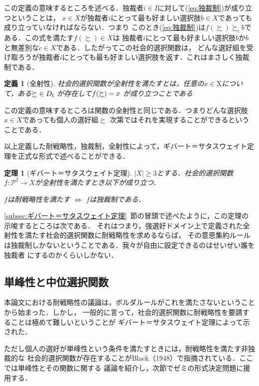 \documentclass[dvipdfmx]{jsarticle}
\newtheorem*{THeorem}{定理}
\newtheorem*{DEfinition}{定義}
\begin{document}
この定義の意味するところを述べる．独裁者$i \in I$に対して(\ref{eq:独裁制})が成り立つということは，
$x \in X$が独裁者$i$にとって最も好ましい選択肢$b \in X$であっても成り立っていなければならない．つまり
このとき(\ref{eq:独裁制})は$f(\succsim) \succsim_i b$である．この式を満たす$f(\succsim) \in X$は
独裁者$i$にとって最も好ましい選択肢$b$か$b$と無差別な$c \in X$である．したがってこの社会的選択関数は，
どんな選好組を受け取ろうが独裁者$i$にとっても最も好ましい選択肢を返す．これはまさしく独裁制である．


\begin{DEfinition}[全射性]
  社会的選択関数が全射性を満たすとは，任意の$x \in \mathrm{X}$について，ある$\succsim \ \in \mathnormal{D}_{\mathrm{I}}$
  が存在して$\mathnormal{f}(\succsim) = x$
  が成り立つことである
\end{DEfinition}

この定義の意味するところは関数の全射性と同じである．つまりどんな選択肢$x \in X$であっても個人の選好組$\succsim$
次第ではそれを実現することができるということである．

以上定義した耐戦略性，独裁制，全射性によって，ギバート＝サタスウェイト定理を正式な形式で述べることができる．

\begin{THeorem}[ギバート＝サタスウェイト定理]
  $|X| \geq 3$とする．社会的選択関数
  $f\colon \mathcal{P}^{I} \to X$が全射性を満たすとき以下が成り立つ．
  \begin{center}
    $f$は耐戦略性を満たす $\Leftrightarrow$ $f$は独裁制である．
  \end{center}
\end{THeorem}

\ref{subsec:ギバート＝サタスウェイト定理}~節の冒頭で述べたように，この定理の示唆するところは次である．
それはつまり，強選好ドメイン上で定義された全射性を満たす社会的選択関数に耐戦略性を求めるならば，
その意思集約ルールは独裁制しかないということである．我々が自由に設定できるのはせいぜい誰を独裁者
にするのかくらいしかない．


\subsection{単峰性と中位選択関数}\label{subsec:単峰性と中位選択関数}
本論文における耐戦略性の議論は，ボルダルールがこれを満たさないということから始まった．しかし，
一般的に言って，社会的選択関数に耐戦略性を要請することは極めて難しいということが
ギバート＝サタスウェイト定理によって示された．

ただし個人の選好が単峰性という条件を満たすときには，耐戦略性を満たす非独裁的な
社会的選択関数が存在することがBlack（1948）で指摘されている．ここでは単峰性とその関数に関する
議論を紹介し，次節でゼミの形式決定問題に援用する．
\end{document}
